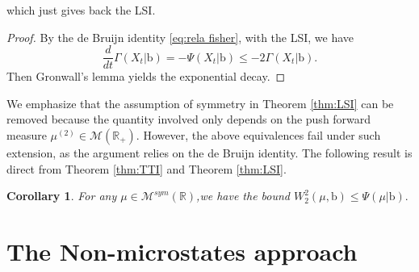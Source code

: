 \documentclass[10pt, reqno]{amsart}
\numberwithin{equation}{section}
\theoremstyle{definition}
\theoremstyle{plain}
\newtheorem{corollary}[definition]{Corollary}
\theoremstyle{remark}
\newcommand{\R}{\mathbb{R}}
\newcommand{\1}{\mathbbm{1}}
\newcommand{\probmsymr}{\mathcal{M}^{sym}(\R)}
\begin{document}
		which just gives back the LSI.
	\begin{proof}
By the de Bruijn identity \eqref{eq:rela fisher}, with the LSI, we have
 \begin{equation*}
			\frac{d}{dt} \Gamma(X_t| \mathbb{\mathrm{b}}) = - \Psi(X_t| \mathbb{\mathrm{b}})\le -2 \Gamma(X_t| \mathbb{\mathrm{b}}).
	\end{equation*}
		Then Gronwall's lemma yields the exponential decay.
	\end{proof}
    We emphasize that the assumption of symmetry in Theorem \ref{thm:LSI} can be removed because the quantity involved only depends on the push forward measure $\mu^{(2)}\in\mathcal{M}(\R_+)$. However, the above equivalences fail under such extension, as the argument relies on the de Bruijn identity. The following result is direct from Theorem \ref{thm:TTI} and Theorem \ref{thm:LSI}.
	\begin{corollary}
	    For any $\mu\in\probmsymr$,we have the bound $W_2^2(\mu,\mathbb{\mathrm{b}})\leq \Psi(\mu| \mathbb{\mathrm{b}}).$
	\end{corollary}

\section{The Non-microstates approach}
\end{document}
